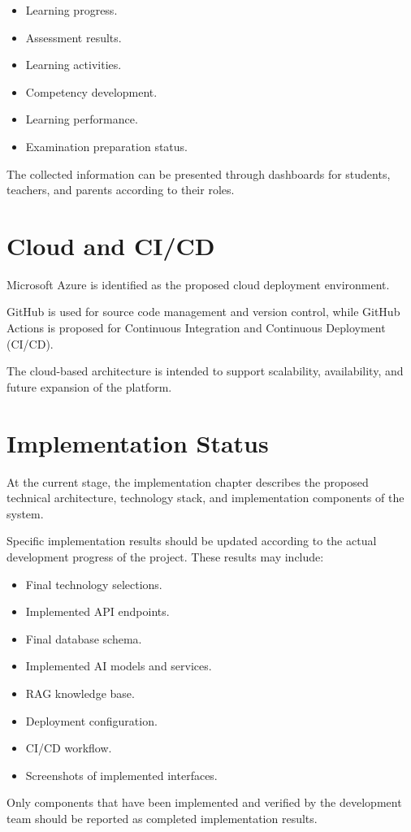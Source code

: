 \begin{itemize}
	\item Learning progress.
	\item Assessment results.
	\item Learning activities.
	\item Competency development.
	\item Learning performance.
	\item Examination preparation status.
\end{itemize}

The collected information can be presented through dashboards for students, teachers, and parents according to their roles.

\section{Cloud and CI/CD}

Microsoft Azure is identified as the proposed cloud deployment environment.

GitHub is used for source code management and version control, while GitHub Actions is proposed for Continuous Integration and Continuous Deployment (CI/CD).

The cloud-based architecture is intended to support scalability, availability, and future expansion of the platform.

\section{Implementation Status}

At the current stage, the implementation chapter describes the proposed technical architecture, technology stack, and implementation components of the system.

Specific implementation results should be updated according to the actual development progress of the project. These results may include:

\begin{itemize}
	\item Final technology selections.
	\item Implemented API endpoints.
	\item Final database schema.
	\item Implemented AI models and services.
	\item RAG knowledge base.
	\item Deployment configuration.
	\item CI/CD workflow.
	\item Screenshots of implemented interfaces.
\end{itemize}

Only components that have been implemented and verified by the development team should be reported as completed implementation results.
